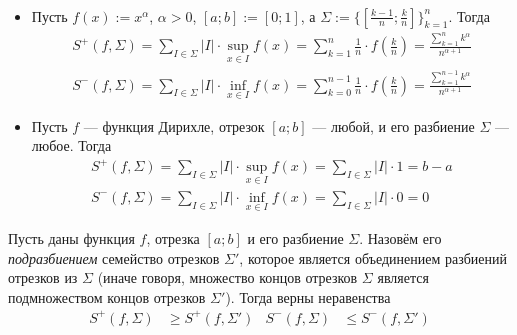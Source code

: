 \documentclass[12pt,a4paper]{article}
\begin{document}
    \begin{example}\ 
        \begin{itemize}
            \item Пусть $f(x) := x^\alpha$, $\alpha > 0$, $[a; b] := [0; 1]$, а $\Sigma := \{[\frac{k-1}{n}; \frac{k}{n}]\}_{k=1}^n$. Тогда
                \begin{gather*}
                    S^+(f, \Sigma) = \sum_{I \in \Sigma} |I| \cdot \sup_{x \in I} f(x) = \sum_{k=1}^n \frac{1}{n} \cdot f\left(\frac{k}{n}\right) = \frac{\sum_{k=1}^n k^\alpha}{n^{\alpha + 1}}\\
                    S^-(f, \Sigma) = \sum_{I \in \Sigma} |I| \cdot \inf_{x \in I} f(x) = \sum_{k=0}^{n-1} \frac{1}{n} \cdot f\left(\frac{k}{n}\right) = \frac{\sum_{k=1}^{n-1} k^\alpha}{n^{\alpha + 1}}
                \end{gather*}

            \item Пусть $f$ --- функция Дирихле, отрезок $[a; b]$ --- любой, и его разбиение $\Sigma$ --- любое. Тогда
                \begin{gather*}
                    S^+(f, \Sigma) = \sum_{I \in \Sigma} |I| \cdot \sup_{x \in I} f(x) = \sum_{I \in \Sigma} |I| \cdot 1 = b - a\\
                    S^-(f, \Sigma) = \sum_{I \in \Sigma} |I| \cdot \inf_{x \in I} f(x) = \sum_{I \in \Sigma} |I| \cdot 0 = 0
                \end{gather*}
        \end{itemize}
    \end{example}

    \begin{lemma}
        Пусть даны функция $f$, отрезка $[a; b]$ и его разбиение $\Sigma$. Назовём его \emph{подразбиением} семейство отрезков $\Sigma'$, которое является объединением разбиений отрезков из $\Sigma$ (иначе говоря, множество концов отрезков $\Sigma$ является подмножеством концов отрезков $\Sigma'$). Тогда верны неравенства
        \begin{align*}
            S^+(f, \Sigma) &\geqslant S^+(f, \Sigma')&
            S^-(f, \Sigma) &\leqslant S^-(f, \Sigma')
        \end{align*}
    \end{lemma}
\end{document}
